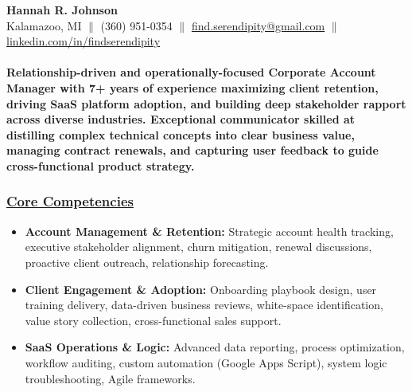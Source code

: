\documentclass[a4paper,10pt]{article}
\begin{document}
\begin{center}
      {\LARGE \textbf{Hannah R. Johnson}} \\
      Kalamazoo, MI $\parallel$ (360) 951-0354 $\parallel$ \href{mailto:find.serendipity@gmail.com}{find.serendipity@gmail.com} $\parallel$ \href{https://www.linkedin.com/in/findserendipity/}{linkedin.com/in/findserendipity}
\end{center}

\paragraph{Relationship-driven and operationally-focused Corporate Account Manager with 7+ years of experience maximizing client retention, driving SaaS platform adoption, and building deep stakeholder rapport across diverse industries. Exceptional communicator skilled at distilling complex technical concepts into clear business value, managing contract renewals, and capturing user feedback to guide cross-functional product strategy.}

\subsubsection{\underline{Core Competencies}}

\begin{itemize}
    \item \textbf{Account Management \& Retention:} Strategic account health tracking, executive stakeholder alignment, churn mitigation, renewal discussions, proactive client outreach, relationship forecasting.
    \item \textbf{Client Engagement \& Adoption:} Onboarding playbook design, user training delivery, data-driven business reviews, white-space identification, value story collection, cross-functional sales support.
    \item \textbf{SaaS Operations \& Logic:} Advanced data reporting, process optimization, workflow auditing, custom automation (Google Apps Script), system logic troubleshooting, Agile frameworks.
\end{itemize}
\end{document}
